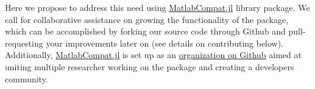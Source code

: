 Here we propose to address this need using \href{https://github.com/MatlabCompat/MatlabCompat.jl}{MatlabCompat.jl} library package. We call for collaborative assistance on growing the functionality of the package, which can be accomplished by forking our source code through Github and pull-requesting your improvements later on (see details on contributing below). Additionally, \href{http://matlabcompat.github.io/}{MatlabCompat.jl} is set up as an \href{https://github.com/MatlabCompat}{organization on Github} aimed at uniting multiple researcher working on the package and creating a developers community.
  
  
  
